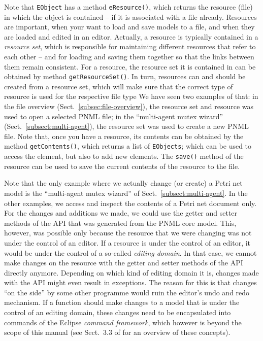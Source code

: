 Note that {\tt EObject} has a method {\tt eResource()},%
which returns the resource (file)%
in which the object is contained -- if it is associated with
a file already. Resources are important, when your want to load and save
models to a file, and when they are loaded and edited in an editor. Actually,
a resource is typically contained in a \emph{resource set},%
which is responsible for maintaining different resources that refer to each
other -- and for loading and saving them together so that the links between them
remain consistent. For a resource, the resource set it is contained in can be
obtained by method {\tt getResourceSet()}.%
In turn, resources can and should be created from a resource set, which will
make sure that the correct type of resource is used for the respective file type We
have seen two examples of that: in the file overview (Sect.~\ref{subsec:file-overview}),
the resource set and resource was used to open a selected PNML file; in the
``multi-agent mutex wizard'' (Sect.~\ref{subsect:multi-agent}), the resource set was used
to create a new PNML file. Note that, once you have a resource, its contents
can be obtained by the method {\tt getContents()},%
which returns a list of {\tt EObjects}; which can be used to access the element,
but also to add new elements. The {\tt save()}%
method of the resource can be used to save the current contents of the resource
to the file.

Note that the only example where we actually change (or create) a Petri net
model is the ``multi-agent mutex wizard'' of Sect.~\ref{subsect:multi-agent}. In
the other examples, we access and inspect the contents of a Petri net document only. For
the changes and additions we made, we could use the getter and setter methods of
the API that was generated from the PNML core model. This, however, was possible
only because the resource that we were changing was not under the control of an
editor. If a resource is under the control of an editor, it would be
under the control of a so-called \emph{editing domain}.%
In that case, we cannot make changes on the resource with the getter and setter
methods of the API directly anymore. Depending on which kind of editing domain
it is, changes made with the API might even result in exceptions. The reason for
this is that changes ``on the side'' by some other programme would ruin the
editor's undo and redo mechanism. If a function should make changes to a model
that is under the control of an editing domain, these changes need to be
encapsulated into commands of the Eclipse \emph{command framework},%
which however is beyond the scope of this manual (see Sect.~3.3 of \cite{BSM06}
for an overview of these concepts). 

